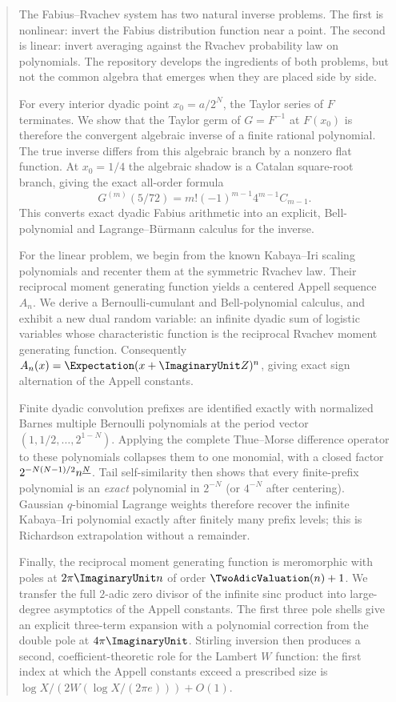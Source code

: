 \documentclass[11pt,oneside]{article}
\numberwithin{equation}{section}
\theoremstyle{definition}
\theoremstyle{remark}
\begin{document}
\hypersetup{pageanchor=false}

\hypersetup{pageanchor=true}

\begin{abstract}
The Fabius--Rvachev system has two natural inverse problems.  The first is nonlinear: invert the
Fabius distribution function near a point.  The second is linear: invert averaging against the
Rvachev probability law on polynomials.  The repository develops the ingredients of both problems,
but not the common algebra that emerges when they are placed side by side.

For every interior dyadic point $x_0=a/2^N$, the Taylor series of $F$ terminates.  We show that the
Taylor germ of $G=F^{-1}$ at $F(x_0)$ is therefore the convergent algebraic inverse of a finite
rational polynomial.  The true inverse differs from this algebraic branch by a nonzero flat function.
At $x_0=1/4$ the algebraic shadow is a Catalan square-root branch, giving the exact all-order formula
\[
 G^{(m)}(5/72)=m!(-1)^{m-1}4^{m-1}C_{m-1}.
\]
This converts exact dyadic Fabius arithmetic into an explicit, Bell-polynomial and
Lagrange--B\"urmann calculus for the inverse.

For the linear problem, we begin from the known Kabaya--Iri scaling polynomials and recenter them
at the symmetric Rvachev law.  Their reciprocal moment generating function yields a centered Appell
sequence $A_n$.  We derive a Bernoulli-cumulant and Bell-polynomial calculus, and exhibit a new
dual random variable: an infinite dyadic sum of logistic variables whose characteristic function is
the reciprocal Rvachev moment generating function.  Consequently
$A_n(x)=\Expectation(x+\ImaginaryUnit Z)^n$, giving exact sign alternation of the Appell constants.

Finite dyadic convolution prefixes are identified exactly with normalized Barnes multiple Bernoulli
polynomials at the period vector $(1,1/2,\ldots,2^{1-N})$.  Applying the complete Thue--Morse
difference operator to these polynomials collapses them to one monomial, with a closed factor
$2^{-N(N-1)/2}\fall nN$.  Tail self-similarity then shows that every finite-prefix polynomial is an
\emph{exact} polynomial in $2^{-N}$ (or $4^{-N}$ after centering).  Gaussian $q$-binomial Lagrange
weights therefore recover the infinite Kabaya--Iri polynomial exactly after finitely many prefix
levels; this is Richardson extrapolation without a remainder.

Finally, the reciprocal moment generating function is meromorphic with poles at $2\pi\ImaginaryUnit n$ of
order $\TwoAdicValuation(n)+1$.  We transfer the full $2$-adic zero divisor of the infinite sinc product into
large-degree asymptotics of the Appell constants.  The first three pole shells give an explicit
three-term expansion with a polynomial correction from the double pole at $4\pi\ImaginaryUnit$.  Stirling
inversion then produces a second, coefficient-theoretic role for the Lambert $W$ function: the first
index at which the Appell constants exceed a prescribed size is
$\log X/(2W(\log X/(2\pi e)))+O(1)$.
\end{abstract}
\end{document}
